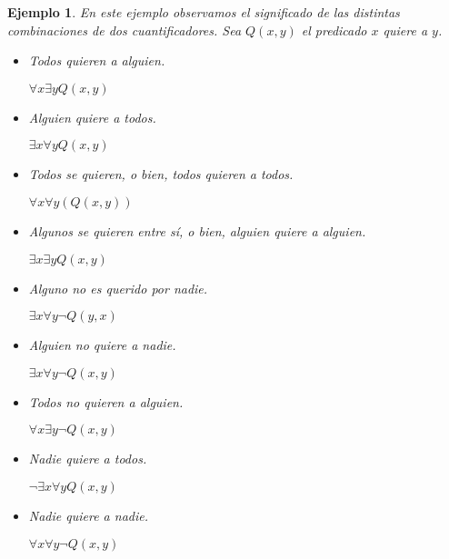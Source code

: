 \documentclass[letterpaper,12pt]{article}
\newtheorem{ejem}{Ejemplo}[]
\begin{document}
    \begin{ejem}
      En este ejemplo observamos el significado de las distintas combinaciones
      de dos cuantificadores. Sea $Q(x, y)$ el predicado $x$ quiere a $y$.
      \begin{itemize}
        \item Todos quieren a alguien.
        \begin{center}
          $\forall x \exists y Q(x,y)$
        \end{center}
        \item Alguien quiere a todos.
        \begin{center}
          $\exists x \forall y Q(x,y)$
        \end{center}
        \item Todos se quieren, o bien, todos quieren a todos.
        \begin{center}
          $\forall x \forall y (Q(x,y))$
        \end{center}
        \item Algunos se quieren entre sí, o bien, alguien quiere a alguien.
        \begin{center}
          $\exists x \exists y Q(x,y)$
        \end{center}
        \item Alguno no es querido por nadie.
        \begin{center}
          $\exists x \forall y \neg Q(y,x)$
        \end{center}
        \item Alguien no quiere a nadie.
        \begin{center}
          $\exists x \forall y \neg Q(x,y)$
        \end{center}
        \item Todos no quieren a alguien.
        \begin{center}
          $\forall x \exists y \neg Q(x,y)$
        \end{center}
        \item Nadie quiere a todos.
        \begin{center}
          $\neg \exists x \forall y Q(x,y)$
        \end{center}
        \item Nadie quiere a nadie.
        \begin{center}
          $\forall x \forall y \neg Q(x,y)$
        \end{center}
      \end{itemize}
    \end{ejem}
\end{document}

